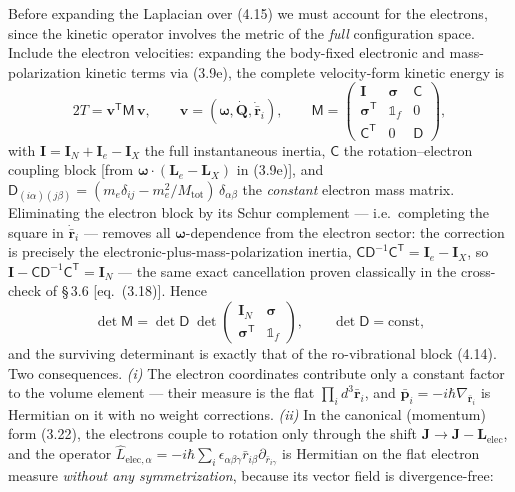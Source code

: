 Before expanding the Laplacian over (4.15) we must account for the electrons, since the kinetic operator involves the metric of the \emph{full} configuration space. Include the electron velocities: expanding the body-fixed electronic and mass-polarization kinetic terms via (3.9e), the complete velocity-form kinetic energy is
\begin{equation}
2T = \mathbf{v}^{\mathsf T}\mathsf{M}\,\mathbf{v},\qquad
\mathbf v=(\boldsymbol\omega,\dot{\mathbf Q},\dot{\bar{\mathbf r}}_i),\qquad
\mathsf{M}=\begin{pmatrix}\mathbf{I} & \boldsymbol\sigma & \mathsf{C}\\[2pt] \boldsymbol\sigma^{\mathsf T} & \mathbb{1}_f & 0\\[2pt] \mathsf{C}^{\mathsf T} & 0 & \mathsf{D}\end{pmatrix},
\tag{4.16}
\end{equation}
with $\mathbf{I}=\mathbf{I}_N+\mathbf{I}_e-\mathbf{I}_X$ the full instantaneous inertia, $\mathsf{C}$ the rotation--electron coupling block [from $\boldsymbol\omega\!\cdot\!(\mathbf{L}_e-\mathbf{L}_X)$ in (3.9e)], and $\mathsf{D}_{(i\alpha)(j\beta)}=(m_e\delta_{ij}-m_e^2/M_{\mathrm{tot}})\,\delta_{\alpha\beta}$ the \emph{constant} electron mass matrix. Eliminating the electron block by its Schur complement --- i.e.\ completing the square in $\dot{\bar{\mathbf r}}_i$ --- removes all $\boldsymbol\omega$-dependence from the electron sector: the correction is precisely the electronic-plus-mass-polarization inertia, $\mathsf{C}\mathsf{D}^{-1}\mathsf{C}^{\mathsf T}=\mathbf{I}_e-\mathbf{I}_X$, so $\mathbf{I}-\mathsf{C}\mathsf{D}^{-1}\mathsf{C}^{\mathsf T}=\mathbf{I}_N$ --- the same exact cancellation proven classically in the cross-check of \S\,3.6 [eq.~(3.18)]. Hence
\begin{equation}
\det\mathsf{M}
=\det\mathsf{D}\;\det\!\begin{pmatrix}\mathbf{I}_N & \boldsymbol\sigma\\ \boldsymbol\sigma^{\mathsf T} & \mathbb 1_f\end{pmatrix},
\qquad \det\mathsf D=\text{const}, \tag{4.17}
\end{equation}
and the surviving determinant is exactly that of the ro-vibrational block (4.14). Two consequences. \emph{(i)} The electron coordinates contribute only a constant factor to the volume element --- their measure is the flat $\prod_id^3\bar{\mathbf r}_i$, and $\hat{\bar{\mathbf p}}_i=-i\hbar\nabla_{\bar{\mathbf r}_i}$ is Hermitian on it with no weight corrections. \emph{(ii)} In the canonical (momentum) form (3.22), the electrons couple to rotation only through the shift $\mathbf J\to\mathbf J-\mathbf L_{\mathrm{elec}}$, and the operator $\hat L_{\mathrm{elec},\alpha}=-i\hbar\sum_i\epsilon_{\alpha\beta\gamma}\bar r_{i\beta}\partial_{\bar r_{i\gamma}}$ is Hermitian on the flat electron measure \emph{without any symmetrization}, because its vector field is divergence-free:
